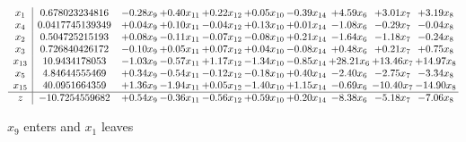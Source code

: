 \documentclass[9pt]{article}
\begin{document}
 \[\begin{array}{c| c c@{\hskip 2pt} c@{\hskip 2pt} c@{\hskip 2pt} c@{\hskip 2pt} c@{\hskip 2pt} c@{\hskip 2pt} c@{\hskip 2pt} c@{\hskip 2pt} }
 x_{1}   &  0.678023234816 & -0.28 x_{9} & +  0.40 x_{11} & +  0.22 x_{12} & +  0.05 x_{10} & -0.39 x_{14} & +  4.59 x_{6} & +  3.01 x_{7} & +  3.19 x_{8}\\
 x_{4}   &  0.0417745139349 & +  0.04 x_{9} & +  0.10 x_{11} & -0.04 x_{12} & +  0.13 x_{10} & +  0.01 x_{14} & -1.08 x_{6} & -0.29 x_{7} & -0.04 x_{8}\\
 x_{2}   &  0.504725215193 & +  0.08 x_{9} & -0.11 x_{11} & -0.07 x_{12} & -0.08 x_{10} & +  0.21 x_{14} & -1.64 x_{6} & -1.18 x_{7} & -0.24 x_{8}\\
 x_{3}   &  0.726840426172 & -0.10 x_{9} & +  0.05 x_{11} & +  0.07 x_{12} & +  0.04 x_{10} & -0.08 x_{14} & +  0.48 x_{6} & +  0.21 x_{7} & +  0.75 x_{8}\\
 x_{13}   &  10.9434178053 & -1.03 x_{9} & -0.57 x_{11} & +  1.17 x_{12} & -1.34 x_{10} & -0.85 x_{14} & + 28.21 x_{6} & + 13.46 x_{7} & + 14.97 x_{8}\\
 x_{5}   &  4.84644555469 & +  0.34 x_{9} & -0.54 x_{11} & -0.12 x_{12} & -0.18 x_{10} & +  0.40 x_{14} & -2.40 x_{6} & -2.75 x_{7} & -3.34 x_{8}\\
 x_{15}   &  40.0951664359 & +  1.36 x_{9} & -1.94 x_{11} & +  0.05 x_{12} & -1.40 x_{10} & +  1.15 x_{14} & -0.69 x_{6} & -10.40 x_{7} & -14.90 x_{8}\\
\hline
z    &  -10.7254559682 & +  0.54 x_{9} & -0.36 x_{11} & -0.56 x_{12} & +  0.59 x_{10} & +  0.20 x_{14} & -8.38 x_{6} & -5.18 x_{7} & -7.06 x_{8}\\
\end{array}\]


 $ x_{9} $ enters and $ x_{1} $ leaves 
\end{document}
